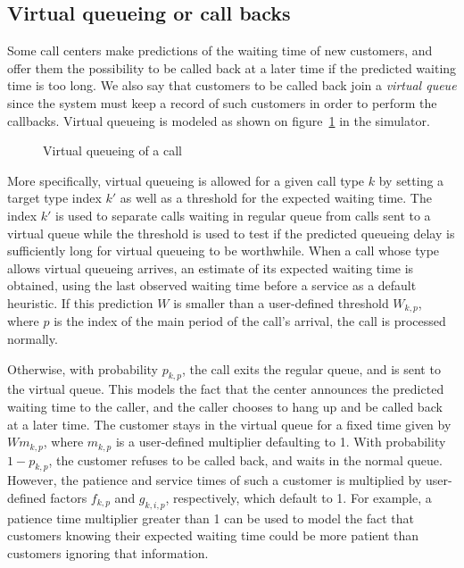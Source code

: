 \subsection{Virtual queueing or call backs}

Some call centers make predictions of the waiting time of new
customers, and offer them the possibility to be called back at a later
time if the predicted waiting time is too long.
We also say that customers to be called back join a \emph{virtual
  queue} since the system must keep a record of such customers in
order to perform the callbacks.
Virtual queueing is modeled as shown on figure~\ref{fig:vqueue} in
the simulator.

\begin{figure}
\centering

\caption{Virtual queueing of a call}
\label{fig:vqueue}
\end{figure}

More specifically,
virtual queueing is allowed for a given call type $k$ by setting a
target type index $k'$ as well as a threshold
for the expected waiting time.
The index $k'$ is used to separate calls waiting in
regular queue from calls sent to a virtual queue
while the threshold is used to test if the predicted queueing delay is
sufficiently long for virtual queueing to be worthwhile.
When a call whose type allows virtual queueing arrives, an estimate of
its expected waiting time is obtained, using the last observed waiting
time before a service as a default heuristic.
If this prediction $W$ is smaller than a user-defined threshold
$W_{k,p}$, where $p$ is the index of the main period of the call's
arrival, the call is processed normally.

Otherwise, with probability $p_{k, p}$, the call exits the regular
queue,
and is sent to the virtual queue. This models the fact that the center
announces the predicted waiting time to the caller, and the
caller chooses to hang up and be called back at a later time.
The customer stays in the virtual queue for a fixed time given
by $Wm_{k, p}$, where $m_{k, p}$ is a user-defined multiplier
defaulting to 1.
With probability $1-p_{k, p}$, the customer refuses to be called back,
and waits in the normal queue.
However, the patience and service times of such a customer is
multiplied by
user-defined factors $f_{k, p}$ and $g_{k,i,p}$, respectively,
which default to 1.
For example,
a patience time multiplier greater than 1 can be used to model the
fact that customers knowing
their expected waiting time could be more patient than
customers ignoring that information.

